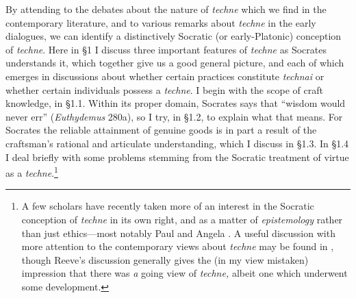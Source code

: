 ﻿\documentclass[11pt]{amsart}
\begin{document}
By attending to the debates about the nature of \emph{techne} which we find in the contemporary literature, and to various remarks about \emph{techne} in the early dialogues, we can identify a distinctively Socratic (or early-Platonic) conception of \emph{techne}. Here in \S1 I discuss three important features of \emph{techne} as Socrates understands it, which together give us a good general picture, and each of which emerges in discussions about whether certain practices constitute \emph{technai} or whether certain individuals possess a \emph{techne}. I begin with the scope of craft knowledge, in \S1.1. Within its proper domain, Socrates says that ``wisdom would never err'' (\emph{Euthydemus} 280a), so I try, in \S1.2, to explain what that means. For Socrates the reliable attainment of genuine goods is in part a result of the craftsman's rational and articulate understanding, which I discuss in \S1.3. In \S1.4 I deal briefly with some problems stemming from the Socratic treatment of virtue as a \emph{techne}.\footnote{A few scholars have recently taken more of an interest in the Socratic conception of \emph{techne} in its own right, and as a matter of \emph{epistemology} rather than just ethics---most notably Paul \citet{woodruff1990pse} and Angela \citet{asmith1998}. A useful discussion with more attention to the contemporary views about \emph{techne} may be found in \citet[37--45]{reeve1989sita}, though Reeve's discussion generally gives the (in my view mistaken) impression that there was \emph{a} going view of \emph{techne,} albeit one which underwent some development.}




\end{document}
